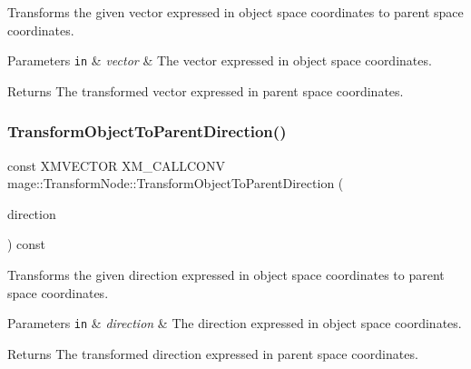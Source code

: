 Transforms the given vector expressed in object space coordinates to parent space coordinates.


\begin{DoxyParams}[1]{Parameters}
\mbox{\tt in}  & {\em vector} & The vector expressed in object space coordinates. \\
\hline
\end{DoxyParams}
\begin{DoxyReturn}{Returns}
The transformed vector expressed in parent space coordinates. 
\end{DoxyReturn}
\hypertarget{structmage_1_1_transform_node_af3f7d31eeb595ac51fe2362c91688398}{}\label{structmage_1_1_transform_node_af3f7d31eeb595ac51fe2362c91688398} 
\subsubsection{\texorpdfstring{Transform\+Object\+To\+Parent\+Direction()}{TransformObjectToParentDirection()}}
{\footnotesize\ttfamily const X\+M\+V\+E\+C\+T\+OR X\+M\+\_\+\+C\+A\+L\+L\+C\+O\+NV mage\+::\+Transform\+Node\+::\+Transform\+Object\+To\+Parent\+Direction (\begin{DoxyParamCaption}\item[{F\+X\+M\+V\+E\+C\+T\+OR}]{direction }\end{DoxyParamCaption}) const\hspace{0.3cm}{\ttfamily [noexcept]}}

Transforms the given direction expressed in object space coordinates to parent space coordinates.


\begin{DoxyParams}[1]{Parameters}
\mbox{\tt in}  & {\em direction} & The direction expressed in object space coordinates. \\
\hline
\end{DoxyParams}
\begin{DoxyReturn}{Returns}
The transformed direction expressed in parent space coordinates. 
\end{DoxyReturn}
\hypertarget{structmage_1_1_transform_node_a449428a24f76ca18b91f84ba3e69c0f3}{}\label{structmage_1_1_transform_node_a449428a24f76ca18b91f84ba3e69c0f3} 
